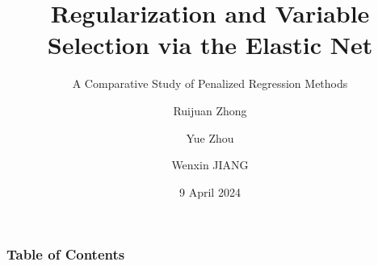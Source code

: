\documentclass{beamer}
\title[GLM Net] %
{Regularization and Variable Selection via the Elastic Net}
\subtitle{A Comparative Study of Penalized Regression Methods}
\author[] %
{Ruijuan Zhong \and Yue Zhou \and Wenxin JIANG} %
\institute[BIOS] %
{
  Department of Biostatistics\\
  City University of Hong Kong
}
\date[April 2024] %
{9 April 2024}
\begin{document}
\frame{\titlepage}


\begin{frame}
\frametitle{Table of Contents}
\tableofcontents
\end{frame}







\end{document}
